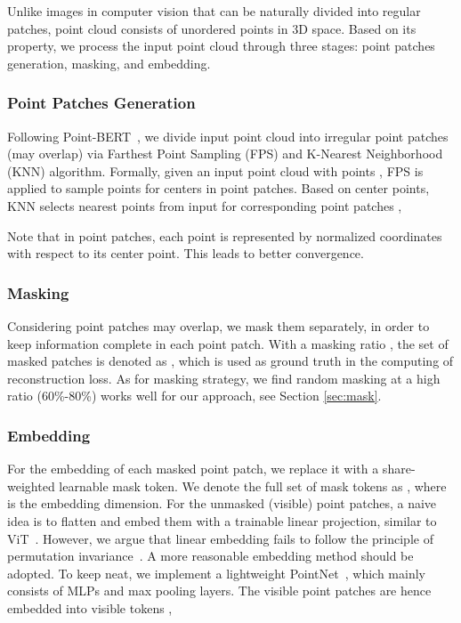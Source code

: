 \documentclass[runningheads]{llncs}
\begin{document}
Unlike images in computer vision that can be naturally divided into regular patches, point cloud consists of unordered points in 3D space. Based on its property, we process the input point cloud through three stages: point patches generation, masking, and embedding.

\subsubsection{Point Patches Generation}
Following Point-BERT~\cite{pointbert}, we divide input point cloud into irregular point patches (may overlap) via Farthest Point Sampling (FPS) and K-Nearest Neighborhood (KNN) algorithm. Formally, given an input point cloud with  points , FPS is applied to sample  points for centers  in point patches. Based on center points, KNN selects  nearest points from input for corresponding point patches ,

   
Note that in point patches, each point is represented by normalized coordinates with respect to its center point. This leads to better convergence.

\subsubsection{Masking}

Considering point patches may overlap, we mask them separately, in order to keep information complete in each point patch. With a masking ratio , the set of masked patches is denoted as , which is used as ground truth in the computing of reconstruction loss. As for masking strategy, we find random masking at a high ratio (60\%-80\%) works well for our approach, see Section \ref{sec:mask}.



\subsubsection{Embedding}
For the embedding of each masked point patch, we replace it with a share-weighted learnable mask token. We denote the full set of mask tokens as , where  is the embedding dimension. For the unmasked (visible) point patches, a naive idea is to flatten and embed them with a trainable linear projection, similar to ViT~\cite{cvvit}. However, we argue that linear embedding fails to follow the principle of permutation invariance~\cite{pointnet}. A more reasonable embedding method should be adopted. To keep neat, we implement a lightweight PointNet~\cite{pointnet}, which mainly consists of MLPs and max pooling layers. The visible point patches  are hence embedded into visible tokens ,
\end{document}
